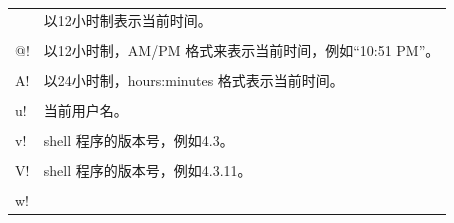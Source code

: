\documentclass[doctor,openright,twoside]{sjtuthesis}
\newcommand{\passthrough}[1]{#1}
\theoremstyle{plain}
\theoremstyle{definition}
\theoremstyle{remark}
\theoremstyle{ocrenumbox}
\theoremstyle{plain}
\begin{document}
\begin{longtable}[]{@{}ll@{}}
\begin{minipage}[t]{0.22\columnwidth}
\end{minipage} & \begin{minipage}[t]{0.72\columnwidth}\raggedright
以12小时制表示当前时间。\strut
\end{minipage}\tabularnewline
\begin{minipage}[t]{0.22\columnwidth}\raggedright
\passthrough{\lstinline!\\@!}\strut
\end{minipage} & \begin{minipage}[t]{0.72\columnwidth}\raggedright
以12小时制，AM/PM 格式来表示当前时间，例如``10:51 PM''。\strut
\end{minipage}\tabularnewline
\begin{minipage}[t]{0.22\columnwidth}\raggedright
\passthrough{\lstinline!\\A!}\strut
\end{minipage} & \begin{minipage}[t]{0.72\columnwidth}\raggedright
以24小时制，hours:minutes 格式表示当前时间。\strut
\end{minipage}\tabularnewline
\begin{minipage}[t]{0.22\columnwidth}\raggedright
\passthrough{\lstinline!\\u!}\strut
\end{minipage} & \begin{minipage}[t]{0.72\columnwidth}\raggedright
当前用户名。\strut
\end{minipage}\tabularnewline
\begin{minipage}[t]{0.22\columnwidth}\raggedright
\passthrough{\lstinline!\\v!}\strut
\end{minipage} & \begin{minipage}[t]{0.72\columnwidth}\raggedright
shell 程序的版本号，例如4.3。\strut
\end{minipage}\tabularnewline
\begin{minipage}[t]{0.22\columnwidth}\raggedright
\passthrough{\lstinline!\\V!}\strut
\end{minipage} & \begin{minipage}[t]{0.72\columnwidth}\raggedright
shell 程序的版本号，例如4.3.11。\strut
\end{minipage}\tabularnewline
\begin{minipage}[t]{0.22\columnwidth}\raggedright
\passthrough{\lstinline!\\w!}\strut
\end{minipage} & \begin{minipage}[t]{0.72\columnwidth}\raggedright

\end{minipage}
\end{longtable}
\end{document}
